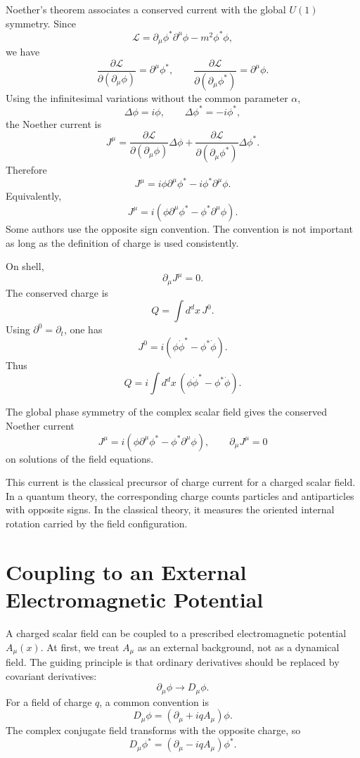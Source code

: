 Noether's theorem associates a conserved current with the global \(U(1)\)
symmetry. Since
\[
    \mathcal{L}=\partial_\mu\phi^*\partial^\mu\phi-m^2\phi^*\phi,
\]
we have
\[
    \frac{\partial\mathcal{L}}{\partial(\partial_\mu\phi)}=\partial^\mu\phi^*,
    \qquad
    \frac{\partial\mathcal{L}}{\partial(\partial_\mu\phi^*)}=\partial^\mu\phi.
\]
Using the infinitesimal variations without the common parameter \(\alpha\),
\[
    \Delta\phi=i\phi,
    \qquad
    \Delta\phi^*=-i\phi^*,
\]
the Noether current is
\[
    J^\mu
    =\frac{\partial\mathcal{L}}{\partial(\partial_\mu\phi)}\Delta\phi
     +\frac{\partial\mathcal{L}}{\partial(\partial_\mu\phi^*)}\Delta\phi^*.
\]
Therefore
\[
    J^\mu=i\phi\partial^\mu\phi^*-i\phi^*\partial^\mu\phi.
\]
Equivalently,
\[
    J^\mu=i(\phi\partial^\mu\phi^*-\phi^*\partial^\mu\phi).
\]
Some authors use the opposite sign convention. The convention is not important
as long as the definition of charge is used consistently.

On shell,
\[
    \partial_\mu J^\mu=0.
\]
The conserved charge is
\[
    Q=\int d^d x\,J^0.
\]
Using \(\partial^0=\partial_t\), one has
\[
    J^0=i(\phi\dot\phi^*-\phi^*\dot\phi).
\]
Thus
\[
    Q=i\int d^d x\,(\phi\dot\phi^*-\phi^*\dot\phi).
\]

\begin{theorembox}
The global phase symmetry of the complex scalar field gives the conserved
Noether current
\[
    J^\mu=i(\phi\partial^\mu\phi^*-\phi^*\partial^\mu\phi),
    \qquad
    \partial_\mu J^\mu=0
\]
on solutions of the field equations.
\end{theorembox}

This current is the classical precursor of charge current for a charged scalar
field. In a quantum theory, the corresponding charge counts particles and
antiparticles with opposite signs. In the classical theory, it measures the
oriented internal rotation carried by the field configuration.

\section{Coupling to an External Electromagnetic Potential}

A charged scalar field can be coupled to a prescribed electromagnetic potential
\(A_\mu(x)\). At first, we treat \(A_\mu\) as an external background, not as a
dynamical field. The guiding principle is that ordinary derivatives should be
replaced by covariant derivatives:
\[
    \partial_\mu\phi\longrightarrow D_\mu\phi.
\]
For a field of charge \(q\), a common convention is
\[
    D_\mu\phi=(\partial_\mu+iqA_\mu)\phi.
\]
The complex conjugate field transforms with the opposite charge, so
\[
    D_\mu\phi^*=(\partial_\mu-iqA_\mu)\phi^*.
\]

